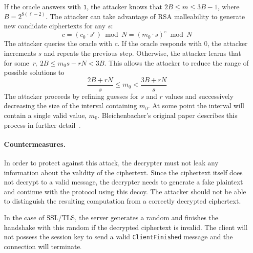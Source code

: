 If the oracle answers with \texttt{1}, the attacker knows that $2B
\leq m \leq 3B-1$, where $B = 2^{8(\ell-2)}$.  The attacker can take
advantage of RSA malleability to generate new candidate ciphertexts
for any $s$:
\[ 
c = (c_{0} \cdot s^e) \bmod N = (m_{0} \cdot s)^e \bmod N 
\] 
The attacker queries the oracle with $c$. If the oracle responds with
$0$, the attacker increments $s$ and repeats the previous
step. Otherwise, the attacker learns that for some~$r$, $2B \leq m_{0}s - rN  < 3B$. This allows the attacker to reduce the range of possible solutions to  
\[ 
\frac{2B+rN}{s} \leq m_{0} < \frac{3B+rN}{s}  
\] 
The attacker proceeds by refining guesses for $s$ and $r$ values and
successively decreasing the size of the interval containing $m_{0}$.  At
some point the interval will contain a single valid value, $m_{0}$.
Bleichenbacher's original paper describes this process in further
detail~\cite{Bleichenbacher}.

\paragraph{Countermeasures.}
In order to protect against this attack, the decrypter must not leak
any information about the \PKCS validity of the ciphertext.  Since the
ciphertext itself does not decrypt to a valid message, the
decrypter needs to generate a fake plaintext and continue with the
protocol using this decoy.  The attacker should not be able to
distinguish the resulting computation from a correctly decrypted
ciphertext.

In the case of SSL/TLS, the server generates a random \pms and finishes
the handshake with this random \pms if the decrypted ciphertext is
invalid.  The client will not possess the session key to send a valid
\texttt{ClientFinished} message and the connection will terminate.

